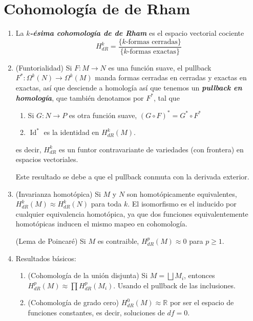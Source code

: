 \documentclass[spanish]{article}
\theoremstyle{definition}
\newcommand{\R}{\mathbb{R}}
\DeclareMathOperator{\Id}{Id}
\begin{document}
	\section{Cohomología de de Rham}\label{sec:4}
	\begin{enumerate}
		\item La \textbf{\textit{$k$-ésima cohomología de de Rham}} es el espacio vectorial cociente
		\[H_{dR}^k=\frac{\{k\text{-formas cerradas}\}}{\{k\text{-formas exactas}\}}\]
		
		\item (Funtorialidad) Si $F:M\to N$ es una función suave, el pullback $F^*:\Omega^k(N)\to\Omega^k(M)$ manda formas cerradas en cerradas y exactas en exactas, así que desciende a homología así que tenemos un \textbf{\textit{pullback en homología}}, que también denotamos por $F^*$, tal que
		\begin{enumerate}
			\item Si $G:N\to P$ es otra función suave, $(G\circ F)^*=G^*\circ F^*$
			\item $\Id^*$ es la identidad en $H_{dR}^k(M)$.
		\end{enumerate}
		es decir, $H_{dR}^k$ es un funtor contravariante de variedades (con frontera) en espacios vectoriales.
		
		Este resultado se debe a que el pullback conmuta con la derivada exterior.
		
		\item (Invarianza homotópica) Si $M$ y $N$ son homotópicamente equivalentes, $H_{dR}^k(M)\approx H_{dR}^k(N)$ para toda $k$. El isomorfismo es el inducido por cualquier equivalencia homotópica, ya que dos funciones equivalentemente homotópicas inducen el mismo mapeo en cohomología.
		
		(Lema de Poincaré) Si $M$ es contraible, $H_{dR}^p(M)\approx0$ para $p\geq1$.
		
		\item Resultados básicos:
		\begin{enumerate}
			\item (Cohomología de la unión disjunta) Si $M=\bigsqcup M_i$, entonces $H_{dR}^p(M)\approx \prod H_{dR}^p(M_i)$. Usando el pullback de las inclusiones.
			
			\item (Cohomología de grado cero) $H_{dR}^0(M)\approx\R$ por ser el espacio de funciones constantes, es decir, soluciones de $df=0$.
			

\end{enumerate}
\end{enumerate}
\end{document}
